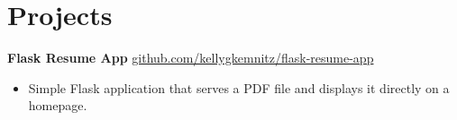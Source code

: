 \documentclass[11pt]{article}       %
\begin{document}

\vspace{-18.5pt}

\section*{Projects}
\textbf{Flask Resume App} \hfill \href{https://github.com/kellygkemnitz/flask-resume-app}{github.com/kellygkemnitz/flask-resume-app} \\
\vspace{-9pt}
\begin{itemize}
 \item Simple Flask application that serves a PDF file and displays it directly on a homepage.
\end{itemize}
%
%
\end{document}
